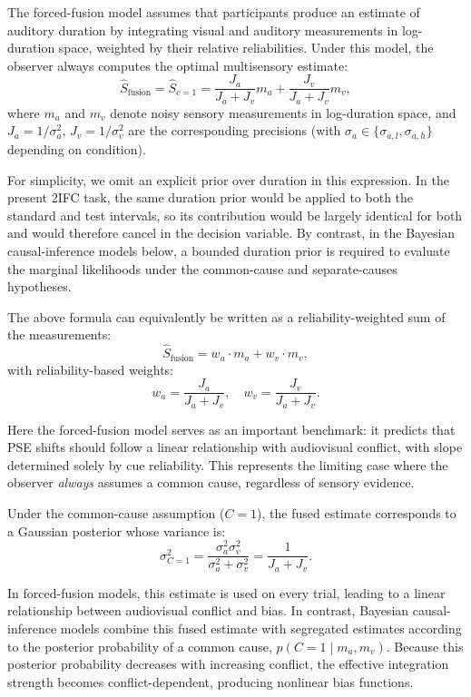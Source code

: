 \documentclass[9pt,lineno,doublespacing]{elife}
\begin{document}
The forced-fusion model assumes that participants produce an estimate of auditory duration by integrating visual and auditory measurements in log-duration space, weighted by their relative reliabilities. Under this model, the observer always computes the optimal multisensory estimate:
\begin{equation}
\label{eq:forced_fusion}
\hat{S}_{\text{fusion}} = \hat{S}_{c=1} = \frac{J_a}{J_a + J_v} m_a + \frac{J_v}{J_a + J_v} m_v,
\end{equation}
where $m_a$ and $m_v$ denote noisy sensory measurements in log-duration space, and $J_a = 1/\sigma_a^2$, $J_v = 1/\sigma_v^2$ are the corresponding precisions (with $\sigma_a \in \{\sigma_{a,l}, \sigma_{a,h}\}$ depending on condition).

For simplicity, we omit an explicit prior over duration in this expression. In the present 2IFC task, the same duration prior would be applied to both the standard and test intervals, so its contribution would be largely identical for both and would therefore cancel in the decision variable. By contrast, in the Bayesian causal-inference models below, a bounded duration prior is required to evaluate the marginal likelihoods under the common-cause and separate-causes hypotheses.

The above formula can equivalently be written as a reliability-weighted sum of the measurements:
\begin{equation}
\hat{S}_{\text{fusion}} = w_a \cdot m_a + w_v \cdot m_v,
\end{equation}
with reliability-based weights:
\begin{equation}
w_a = \frac{J_a}{J_a + J_v}, \quad w_v = \frac{J_v}{J_a + J_v}.
\end{equation}

Here the forced-fusion model serves as an important benchmark: it predicts that PSE shifts should follow a linear relationship with audiovisual conflict, with slope determined solely by cue reliability. This represents the limiting case where the observer \textit{always} assumes a common cause, regardless of sensory evidence. 

Under the common-cause assumption ($C=1$), the fused estimate corresponds to a Gaussian posterior whose variance is:
\begin{equation}
\sigma_{C=1}^2 = \frac{\sigma_a^2 \sigma_v^2}{\sigma_a^2 + \sigma_v^2}
= \frac{1}{J_a + J_v}.
\label{eq:fusion_var}
\end{equation}

In forced-fusion models, this estimate is used on every trial, leading to a linear relationship between audiovisual conflict and bias. In contrast, Bayesian causal-inference models combine this fused estimate with segregated estimates according to the posterior probability of a common cause, $p(C=1 \mid m_a,m_v)$. Because this posterior probability decreases with increasing conflict, the effective integration strength becomes conflict-dependent, producing nonlinear bias functions.
\end{document}
